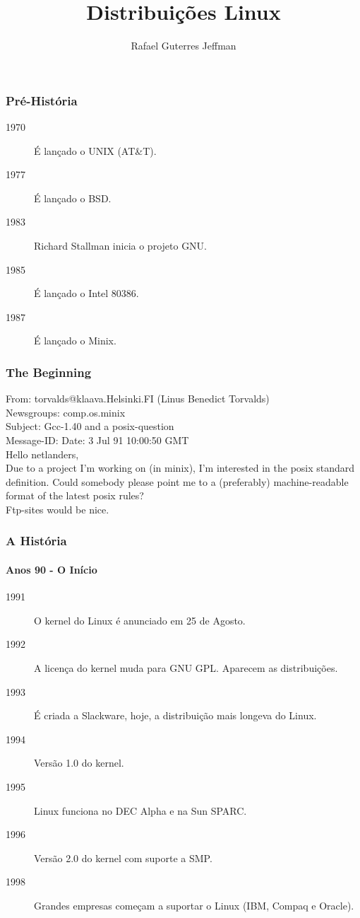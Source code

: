 \documentclass[aspectratio=169,14pt]{beamer}
\title{Distribuições Linux}
\author{Rafael Guterres Jeffman}
\institute{Faculdade Senac Porto Alegre \\ Tchelinux}
\date{}
\begin{document}
\begin{frame}
    \titlepage
\end{frame}

\begin{frame}
    \frametitle{Pré-História}
    \begin{description}
        \item[1970]{É lançado o UNIX (AT\&T).}
        \item[1977]{É lançado o BSD.}
        \item[1983]{Richard Stallman inicia o projeto GNU.}
        \item[1985]{É lançado o Intel 80386.}
        \item[1987]{É lançado o Minix.}
    \end{description}
\end{frame}

\begin{frame}
    \frametitle{The Beginning}
    From: torvalds@klaava.Helsinki.FI (Linus Benedict Torvalds) \\
    Newsgroups: comp.os.minix \\
    Subject: Gcc-1.40 and a posix-question \\
    Message-ID: Date: 3 Jul 91 10:00:50 GMT \\
    \vspace{1em}
    Hello netlanders, \\
    Due to a project I'm working on (in minix), I'm interested in the
    posix standard definition. Could somebody please point me to a
    (preferably) machine-readable format of the latest posix rules? \\
    Ftp-sites would be nice.
\end{frame}

\begin{frame}
    \frametitle{A História}
    \framesubtitle{Anos 90 - O Início}
    \begin{description}
   \item[1991]{O kernel do Linux é anunciado em 25 de Agosto.}
   \item[1992]{A licença do kernel muda para GNU GPL. Aparecem as distribuições.}
   \item[1993]{É criada a Slackware, hoje, a distribuição mais longeva do Linux.}
   \item[1994]{Versão 1.0 do kernel.}
   \item[1995]{Linux funciona no DEC Alpha e na Sun SPARC.}
   \item[1996]{Versão 2.0 do kernel com suporte a SMP.}
   \item[1998]{Grandes empresas começam a suportar o Linux (IBM, Compaq e Oracle).}
    \end{description}
\end{frame}
\end{document}
